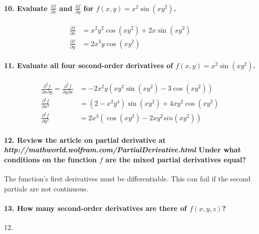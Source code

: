 \documentclass{article}
\begin{document}
\paragraph{10. Evaluate $\frac{\partial f}{\partial x}$ and $\frac{\partial f}{\partial y}$ for $f(x,y) = x^2 \sin(xy^2)$.}

\begin{align*}
   \frac{\partial f}{\partial x} &= x^2 y^2 \cos (x y^2) + 2x\sin(x y^2) \\
   \frac{\partial f}{\partial y} &= 2x^3 y \cos(xy^2)
\end{align*}

\paragraph{11. Evaluate all four second-order derivatives of $f(x,y) = x^2 \sin(xy^2)$.}


\begin{align*}
    \frac{\partial^2 f}{\partial x \partial y} = \frac{\partial^2 f}{\partial y \partial x} &= -2x^2 y\left(xy^2\sin\left(xy^2\right)-3\cos\left(xy^2\right)\right) \\
    \frac{\partial^2 f}{\partial x^2} &= \left(2-x^2y^4\right)\sin(xy^2)+4xy^2\cos(xy^2) \\
    \frac{\partial^2 f}
    {\partial y^2} &= 2x^3 \left(\cos(xy^2)-2xy^2sin(xy^2)\right)
\end{align*}


\paragraph{12. Review the article on partial derivative at {\it http://mathworld.wolfram.com/PartialDerivative.html} Under what conditions on the function $f$ are the mixed partial derivatives equal?}

The function's first derivatives must be differentiable. This can fail if the second partials are not continuous.

\paragraph{13. How many second-order derivatives are there of $f(x,y,z)$?}

12.
\end{document}
